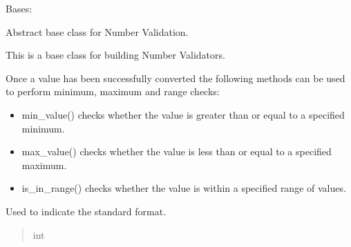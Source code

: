 \documentclass[letterpaper,10pt,english]{sphinxmanual}
\begin{document}
\begin{fulllineitems}
\label{\detokenize{apache_commons_validator_python.routines:apache_commons_validator_python.routines.abstract_number_validator.AbstractNumberValidator}}
\pysigstartsignatures
{}
\pysigstopsignatures
\sphinxAtStartPar
Bases: {\hyperref[\detokenize{apache_commons_validator_python.routines:apache_commons_validator_python.routines.abstract_format_validator.AbstractFormatValidator}]{}}

\sphinxAtStartPar
Abstract base class for Number Validation.

\sphinxAtStartPar
This is a base class for building Number Validators.

\sphinxAtStartPar
Once a value has been successfully converted the following methods can be used
to perform minimum, maximum and range checks:
\begin{itemize}
\item {} 
\sphinxAtStartPar
min\_value() checks whether the value is greater than or equal to a specified minimum.

\item {} 
\sphinxAtStartPar
max\_value() checks whether the value is less than or equal to a specified maximum.

\item {} 
\sphinxAtStartPar
is\_in\_range() checks whether the value is within a specified range of values.

\end{itemize}

\begin{fulllineitems}
\label{\detokenize{apache_commons_validator_python.routines:apache_commons_validator_python.routines.abstract_number_validator.AbstractNumberValidator.STANDARD_FORMAT}}
\pysigstartsignatures
{}
\pysigstopsignatures
\sphinxAtStartPar
Used to indicate the standard format.
\begin{quote}\begin{description}
\sphinxAtStartPar
int


\end{description}
\end{quote}
\end{fulllineitems}
\end{fulllineitems}
\end{document}
